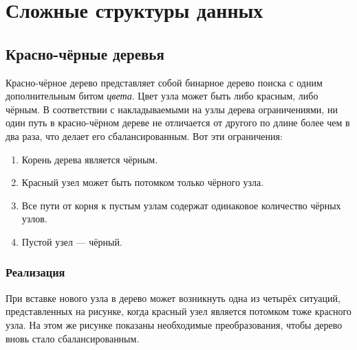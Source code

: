 \chapter{Сложные структуры данных}
\label{ch:advanced-ds}

\section{Красно-чёрные деревья}
\label{sec:rb-tree}
Красно-чёрное дерево представляет собой бинарное дерево поиска с одним дополнительным битом \emph{цвета}. Цвет узла может быть либо красным, либо чёрным. В соответствии с накладываемыми на узлы дерева ограничениями, ни один путь в красно-чёрном дереве не отличается от другого по длине более чем в два раза, что делает его сбалансированным. Вот эти ограничения:
\begin{enumerate}
  \item Корень дерева является чёрным.
  \item Красный узел может быть потомком только чёрного узла.
  \item Все пути от корня к пустым узлам содержат одинаковое количество чёрных узлов.
  \item Пустой узел — чёрный.
\end{enumerate}

\subsection{Реализация}
При вставке нового узла в дерево может возникнуть одна из четырёх ситуаций, представленных на рисунке, когда красный узел является потомком тоже красного узла. На этом же рисунке показаны необходимые преобразования, чтобы дерево вновь стало сбалансированным.

